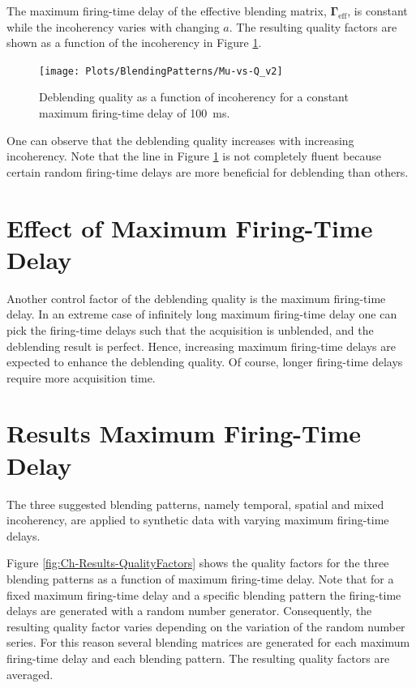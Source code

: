The maximum firing-time delay of the effective blending matrix, $\mathbf{\Gamma}_{\mathrm{eff}}$, is constant while the incoherency  varies with changing $a$. The resulting quality factors are shown as a function of the incoherency in Figure \ref{fig:Ch-Results-Quality-vs-Incoherency}.


\begin{figure}
	\centering
	\texttt{[image: Plots/BlendingPatterns/Mu-vs-Q\_v2]}
	\caption{Deblending quality as a function of incoherency for a constant maximum firing-time delay of \SI{100}{\milli\second}.}
	\label{fig:Ch-Results-Quality-vs-Incoherency}
\end{figure}

One can observe that the deblending quality increases with increasing incoherency. Note that the line in Figure \ref{fig:Ch-Results-Quality-vs-Incoherency} is not completely fluent because certain random firing-time delays are more beneficial for deblending than others.

\section{Effect of Maximum Firing-Time Delay}

Another control factor of the deblending quality is the maximum firing-time delay. In an extreme case of infinitely long maximum firing-time delay one can pick the firing-time delays such that the acquisition is unblended, and the deblending result is perfect. Hence, increasing maximum firing-time delays are expected to enhance the deblending quality. Of course, longer firing-time delays require more acquisition time.



\section{Results Maximum Firing-Time Delay}

The three suggested blending patterns, namely temporal, spatial and mixed incoherency, are applied to synthetic data with varying maximum firing-time delays. 

Figure \ref{fig:Ch-Results-QualityFactors} shows the quality factors for the three blending patterns as a function of maximum firing-time delay. Note that for a fixed maximum firing-time delay and a specific blending pattern the firing-time delays are generated with a random number generator. Consequently, the resulting quality factor varies depending on the variation of the random number series. For this reason several blending matrices are generated for each maximum firing-time delay and each blending pattern. The resulting quality factors are averaged.

